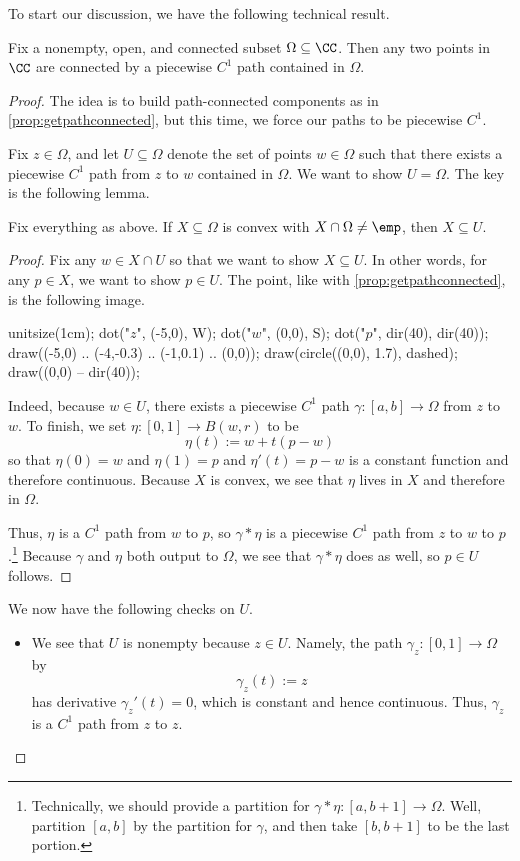 To start our discussion, we have the following technical result.
\begin{lemma}
	Fix a nonempty, open, and connected subset $\Omega\subseteq\CC$. Then any two points in $\CC$ are connected by a piecewise $C^1$ path contained in $\Omega$.
\end{lemma}
\begin{proof}
	The idea is to build path-connected components as in \autoref{prop:getpathconnected}, but this time, we force our paths to be piecewise $C^1$.

	Fix $z\in\Omega$, and let $U\subseteq\Omega$ denote the set of points $w\in \Omega$ such that there exists a piecewise $C^1$ path from $z$ to $w$ contained in $\Omega$. We want to show $U=\Omega$. The key is the following lemma.
	\begin{lemma} \label{lem:convexinconnectedcomp}
		Fix everything as above. If $X\subseteq\Omega$ is convex with $X\cap\Omega\ne\emp$, then $X\subseteq U$.
	\end{lemma}
	\begin{proof}
		Fix any $w\in X\cap U$ so that we want to show $X\subseteq U$. In other words, for any $p\in X$, we want to show $p\in U$. The point, like with \autoref{prop:getpathconnected}, is the following image.
		\begin{center}
			\begin{asy}
				unitsize(1cm);
				dot("$z$", (-5,0), W);
				dot("$w$", (0,0), S);
				dot("$p$", dir(40), dir(40));
				draw((-5,0) .. (-4,-0.3) .. (-1,0.1) .. (0,0));
				draw(circle((0,0), 1.7), dashed);
				draw((0,0) -- dir(40));
			\end{asy}
		\end{center}
		Indeed, because $w\in U$, there exists a piecewise $C^1$ path $\gamma:[a,b]\to\Omega$ from $z$ to $w$. To finish, we set $\eta:[0,1]\to B(w,r)$ to be
		\[\eta(t):=w+t(p-w)\]
		so that $\eta(0)=w$ and $\eta(1)=p$ and $\eta'(t)=p-w$ is a constant function and therefore continuous. Because $X$ is convex, we see that $\eta$ lives in $X$ and therefore in $\Omega$.
		
		Thus, $\eta$ is a $C^1$ path from $w$ to $p$, so $\gamma*\eta$ is a piecewise $C^1$ path from $z$ to $w$ to $p$.\footnote{Technically, we should provide a partition for $\gamma*\eta:[a,b+1]\to\Omega$. Well, partition $[a,b]$ by the partition for $\gamma$, and then take $[b,b+1]$ to be the last portion.} Because $\gamma$ and $\eta$ both output to $\Omega$, we see that $\gamma*\eta$ does as well, so $p\in U$ follows.
	\end{proof}
	We now have the following checks on $U$.
	\begin{itemize}
		\item We see that $U$ is nonempty because $z\in U$. Namely, the path $\gamma_z:[0,1]\to\Omega$ by
		\[\gamma_z(t):=z\]
		has derivative $\gamma_z'(t)=0$, which is constant and hence continuous. Thus, $\gamma_z$ is a $C^1$ path from $z$ to $z$.


\end{itemize}
\end{proof}
